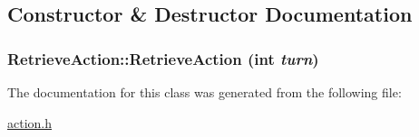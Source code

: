\subsection{Constructor \& Destructor Documentation}
\hypertarget{classRetrieveAction_f17af7ee02f88f2af7e30ab4635d5c11}{
\subsubsection[{RetrieveAction}]{\setlength{\rightskip}{0pt plus 5cm}RetrieveAction::RetrieveAction (int {\em turn})}}
\label{classRetrieveAction_f17af7ee02f88f2af7e30ab4635d5c11}




The documentation for this class was generated from the following file:\begin{CompactItemize}
\item 
\hyperlink{action_8h}{action.h}\end{CompactItemize}
